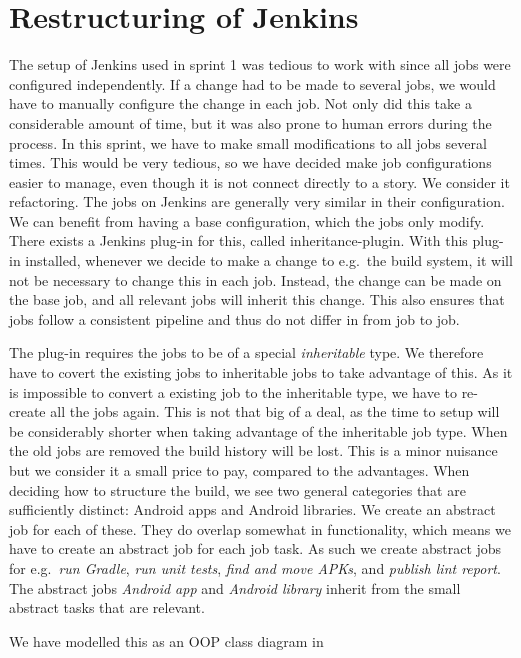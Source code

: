 



\chapter{Restructuring of Jenkins}
The setup of Jenkins used in sprint 1 was tedious to work with since all jobs were configured independently. If a change had to be made to several jobs, we would have to manually configure the change in each job. Not only did this take a considerable amount of time, but it was also prone to human errors during the process. In this sprint, we have to make small modifications to all jobs several times. This would be very tedious, so we have decided make job configurations easier to manage, even though it is not connect directly to a story. We consider it refactoring.
 The jobs on Jenkins are generally very similar in their configuration. We can benefit from having a base configuration, which the jobs only modify. There exists a Jenkins plug-in for this, called inheritance-plugin\parencite{jenkins-inheritance}. With this plug-in installed, whenever we decide to make a change to e.g.\ the build system, it will not be necessary to change this in each job. Instead, the change can be made on the base job, and all relevant jobs will inherit this change. This also ensures that jobs follow a consistent pipeline and thus do not differ in from job to job.

The plug-in requires the jobs to be of a special \emph{inheritable} type. We therefore have to covert the existing jobs to inheritable jobs to take advantage of this. As it is impossible to convert a existing job to the inheritable type, we have to re-create all the jobs again. This is not that big of a deal, as the time to setup will be considerably shorter when taking advantage of the inheritable job type. When the old jobs are removed the build history will be lost. This is a minor nuisance but we consider it a small price to pay, compared to the advantages. When deciding how to structure the build, we see two general categories that are sufficiently distinct: Android apps and Android libraries. We create an abstract job for each of these. They do overlap somewhat in functionality, which means we have to create an abstract job for each job task. As such we create abstract jobs for e.g.\ \emph{run Gradle}, \emph{run unit tests}, \emph{find and move APKs}, and \emph{publish lint report}. The abstract jobs \emph{Android app} and \emph{Android library} inherit from the small abstract tasks that are relevant.

We have modelled this as an OOP class diagram in 




